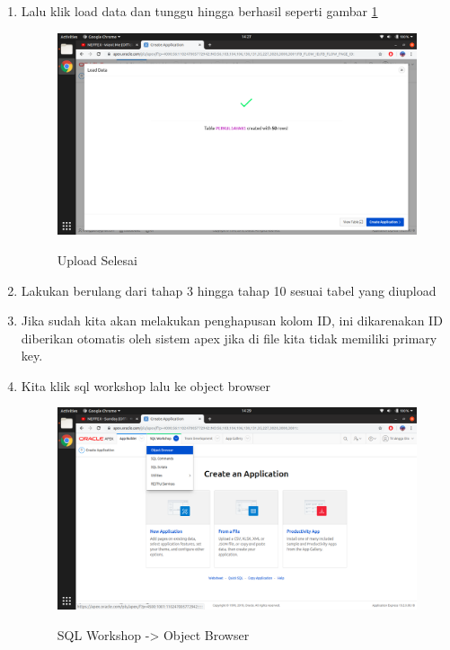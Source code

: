 \begin{enumerate}
\item Lalu klik load data dan tunggu hingga berhasil seperti gambar \ref{8}
\begin{figure}[H]
\centering
\caption{Upload Selesai}
\includegraphics[width=1\textwidth]{figures/8}
\label{8}
\end{figure}

\item Lakukan berulang dari tahap 3 hingga tahap 10 sesuai tabel yang diupload

\item Jika sudah kita akan melakukan penghapusan kolom ID, ini dikarenakan ID diberikan otomatis oleh sistem apex jika di file kita tidak memiliki primary key.

\item Kita klik sql workshop lalu ke object browser
\begin{figure}[H]
\centering
\caption{SQL Workshop -> Object Browser}
\includegraphics[width=1\textwidth]{figures/9}
\label{9}
\end{figure}


\end{enumerate}
